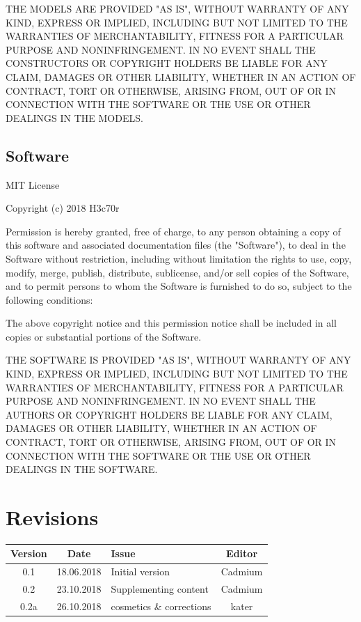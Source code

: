 \documentclass[a4paper]{scrartcl}
\begin{document}
\noindent
THE MODELS ARE PROVIDED "{}AS IS"{}, WITHOUT WARRANTY OF ANY KIND, EXPRESS OR
IMPLIED, INCLUDING BUT NOT LIMITED TO THE WARRANTIES OF MERCHANTABILITY,
FITNESS FOR A PARTICULAR PURPOSE AND NONINFRINGEMENT. IN NO EVENT SHALL THE
CONSTRUCTORS OR COPYRIGHT HOLDERS BE LIABLE FOR ANY CLAIM, DAMAGES OR OTHER
LIABILITY, WHETHER IN AN ACTION OF CONTRACT, TORT OR OTHERWISE, ARISING FROM,
OUT OF OR IN CONNECTION WITH THE SOFTWARE OR THE USE OR OTHER DEALINGS IN THE
MODELS.

\subsection{Software}
MIT License

\noindent
Copyright (c) 2018 H3c70r

\noindent
Permission is hereby granted, free of charge, to any person obtaining a copy
of this software and associated documentation files (the "{}Software"{}), to deal
in the Software without restriction, including without limitation the rights
to use, copy, modify, merge, publish, distribute, sublicense, and/or sell
copies of the Software, and to permit persons to whom the Software is
furnished to do so, subject to the following conditions:

\noindent
The above copyright notice and this permission notice shall be included in all
copies or substantial portions of the Software.

\noindent
THE SOFTWARE IS PROVIDED "{}AS IS"{}, WITHOUT WARRANTY OF ANY KIND, EXPRESS OR
IMPLIED, INCLUDING BUT NOT LIMITED TO THE WARRANTIES OF MERCHANTABILITY,
FITNESS FOR A PARTICULAR PURPOSE AND NONINFRINGEMENT. IN NO EVENT SHALL THE
AUTHORS OR COPYRIGHT HOLDERS BE LIABLE FOR ANY CLAIM, DAMAGES OR OTHER
LIABILITY, WHETHER IN AN ACTION OF CONTRACT, TORT OR OTHERWISE, ARISING FROM,
OUT OF OR IN CONNECTION WITH THE SOFTWARE OR THE USE OR OTHER DEALINGS IN THE
SOFTWARE.



\section{Revisions}

\begin{tabular}{|c|c|l|c|}
\hline
Version & Date & Issue & Editor \\
\hline\hline 
0.1 & 18.06.2018 & Initial version & Cadmium \\
\hline
0.2 & 23.10.2018 & Supplementing content & Cadmium \\
\hline
0.2a & 26.10.2018 & cosmetics \& corrections & kater \\
\hline
\end{tabular}

\newpage
\end{document}
